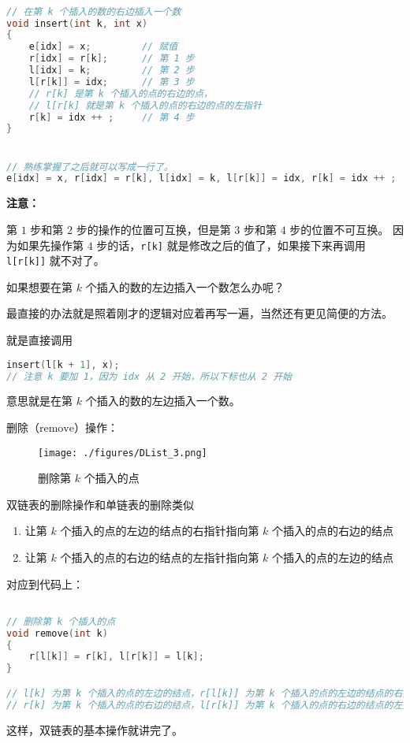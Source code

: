 \begin{lstlisting}[language=cpp]

// 在第 k 个插入的数的右边插入一个数
void insert(int k, int x)
{
    e[idx] = x;         // 赋值
    r[idx] = r[k];      // 第 1 步
    l[idx] = k;         // 第 2 步
    l[r[k]] = idx;      // 第 3 步
    // r[k] 是第 k 个插入的点的右边的点，
    // l[r[k] 就是第 k 个插入的点的右边的点的左指针
    r[k] = idx ++ ;     // 第 4 步
}


// 熟练掌握了之后就可以写成一行了。
e[idx] = x, r[idx] = r[k], l[idx] = k, l[r[k]] = idx, r[k] = idx ++ ;

\end{lstlisting}

\textbf{注意：}

第 $1$ 步和第 $2$ 步的操作的位置可互换，但是第 $3$ 步和第 $4$ 步的位置不可互换。
因为如果先操作第 $4$ 步的话，\verb|r[k]| 就是修改之后的值了，如果接下来再调用 \verb|l[r[k]]| 就不对了。

如果想要在第 $k$ 个插入的数的左边插入一个数怎么办呢？

最直接的办法就是照着刚才的逻辑对应着再写一遍，当然还有更见简便的方法。

就是直接调用 \begin{lstlisting}[language=cpp]
insert(l[k + 1], x);
// 注意 k 要加 1，因为 idx 从 2 开始，所以下标也从 2 开始
\end{lstlisting}
意思就是在第 $k$ 个插入的数的左边插入一个数。

删除（$\text{remove}$）操作：
\begin{figure}[ht]
\centering
\texttt{[image: ./figures/DList\_3.png]}
\caption{删除第 $k$ 个插入的点} \label{DList_fig3}
\end{figure}

双链表的删除操作和单链表的删除类似

\begin{enumerate}
\item 让第 $k$ 个插入的点的左边的结点的右指针指向第 $k$ 个插入的点的右边的结点
\item 让第 $k$ 个插入的点的右边的结点的左指针指向第 $k$ 个插入的点的左边的结点
\end{enumerate}

对应到代码上：

\begin{lstlisting}[language=cpp]

// 删除第 k 个插入的点
void remove(int k)
{
    r[l[k]] = r[k], l[r[k]] = l[k];
}

// l[k] 为第 k 个插入的点的左边的结点，r[l[k]] 为第 k 个插入的点的左边的结点的右指针
// r[k] 为第 k 个插入的点的右边的结点，l[r[k]] 为第 k 个插入的点的右边的结点的左指针
\end{lstlisting}

这样，双链表的基本操作就讲完了。